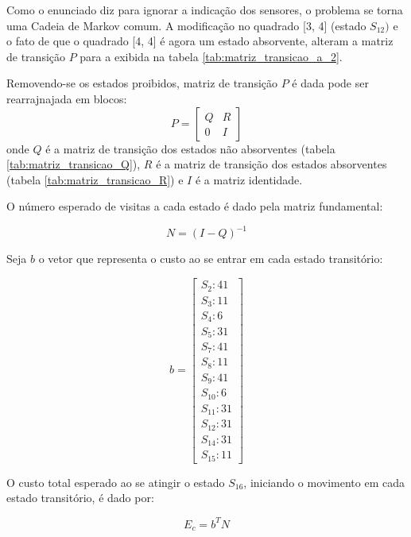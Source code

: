 \begin{tcolorbox}[title=Resposta:]
Como o enunciado diz para ignorar a indicação dos sensores, o problema se torna uma Cadeia de Markov comum. A modificação no quadrado [3, 4] (estado $S_{12})$ e o fato de que o quadrado [4, 4] é agora um estado absorvente, alteram a matriz de transição $P$ para a exibida na tabela \ref{tab:matriz_transicao_a_2}.

Removendo-se os estados proibidos, matriz de transição $P$ é dada pode ser rearrajnajada em blocos:
\begin{equation}
    P = \begin{bmatrix}
        Q & R \\
        0 & I
    \end{bmatrix}
\end{equation}
onde $Q$ é a matriz de transição dos estados não absorventes (tabela \ref{tab:matriz_transicao_Q}), $R$ é a matriz de transição dos estados absorventes (tabela \ref{tab:matriz_transicao_R}) e $I$ é a matriz identidade.

O número esperado de visitas a cada estado é dado pela matriz fundamental: 

\begin{equation}
    N = (I - Q)^{-1}
\end{equation}

Seja $b$ o vetor que representa o custo ao se entrar em cada estado transitório:

\begin{equation}
    b = 
\begin{bmatrix}
S_2: 41 \\
S_3: 11 \\
S_4: 6 \\
S_5: 31 \\
S_7: 41 \\
S_8: 11 \\
S_9: 41 \\
S_{10}: 6 \\
S_{11}: 31 \\
S_{12}: 31 \\
S_{14}: 31 \\
S_{15}: 11
\end{bmatrix}
\end{equation}

O custo total esperado ao se atingir o estado $S_{16}$, iniciando o movimento em cada estado transitório, é dado por:

\begin{equation}
    E_c = b^TN
\end{equation}


\end{tcolorbox}
